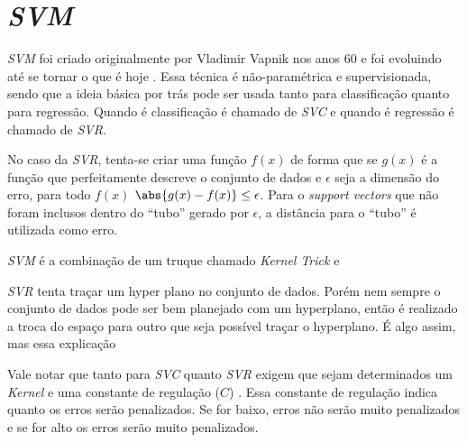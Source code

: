 
\section{\textit{\acrfull{SVM}}}

\textit{\acrshort{SVM}} foi criado originalmente por Vladimir Vapnik nos anos 60 e foi evoluindo até se tornar o que é hoje  \cite{Smola03atutorial}. Essa técnica é não-paramétrica e supervisionada, sendo que a ideia básica por trás pode ser usada tanto para classificação quanto para regressão. Quando é classificação é chamado de \textit{\acrfull{SVC}} e quando é regressão é chamado de \textit{\acrfull{SVR}}. 

No caso da \textit{\acrshort{SVR}}, tenta-se criar uma função \(f(x)\) de forma que se \(g(x)\) é a função que perfeitamente descreve o conjunto de dados e \(\epsilon\) seja a dimensão do erro, para todo \(f(x)\)  \(\abs{g(x) - f(x)} \leq \epsilon \). Para o \textit{support vectors} que não foram inclusos dentro do ``tubo'' gerado por \(\epsilon\), a distância para o ``tubo'' é utilizada como erro.

\textit{\acrshort{SVM}} é a combinação de um truque chamado \textit{Kernel Trick} e 





\textit{\acrshort{SVR}} tenta traçar um hyper plano no conjunto de dados. Porém nem sempre o conjunto de dados pode ser bem planejado com um hyperplano, então é realizado a troca do espaço para outro que seja possível traçar o hyperplano. É algo assim, mas essa explicação



Vale notar que tanto para \textit{\acrshort{SVC}} quanto \textit{\acrshort{SVR}} exigem que sejam determinados um \textit{Kernel} e uma constante de regulação (\(C\)) \cite{murphy2012machine}. Essa constante de regulação indica quanto os erros serão penalizados. Se for baixo, erros não serão muito penalizados e se for alto os erros serão muito penalizados.


